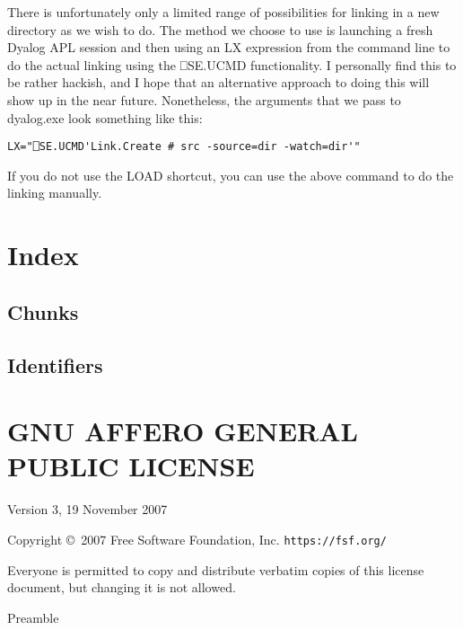 \documentclass{article}%
\begin{document}
There is unfortunately only a limited range of possibilities for
linking in a new directory as we wish to do.
The method we choose to use is launching a fresh Dyalog APL session
and then using an {\Tt{}LX\nwendquote} expression from the command line
to do the actual linking using the {\Tt{}⎕SE.UCMD\nwendquote} functionality.
I personally find this to be rather hackish, and I hope that an
alternative approach to doing this will show up in the near future.
Nonetheless, the arguments that we pass to {\Tt{}dyalog.exe\nwendquote}
look something like this:

\begin{verbatim}
LX="⎕SE.UCMD'Link.Create # src -source=dir -watch=dir'"
\end{verbatim}

If you do not use the {\Tt{}LOAD\nwendquote} shortcut, you can use the above
command to do the linking manually.

\section{Index}

\subsection{Chunks}

\nowebchunks

\subsection{Identifiers}

\nowebindex

\clearpage
\section{GNU AFFERO GENERAL PUBLIC LICENSE}

\begin{center}
{\parindent 0in

Version 3, 19 November 2007

Copyright \copyright\    2007 Free Software Foundation, Inc. \texttt{https://fsf.org/}

\bigskip
Everyone is permitted to copy and distribute verbatim copies of this
license document, but changing it is not allowed.}

\end{center}

\begin{center}
{\Large \sc Preamble}
\end{center}
\end{document}
